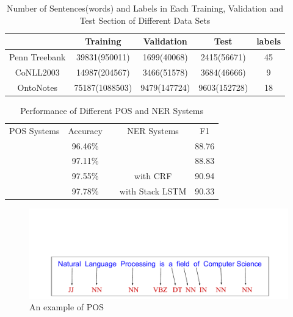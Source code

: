 \documentclass{sfuthesis}
\begin{document}

\begin{table}[]
\centering
\caption{Number of Sentences(words) and Labels in Each Training, Validation and Test Section of Different Data Sets}
\label{table:my-dataset}
\begin{tabular}{|c|c|c|c|c|} \hline
      & Training  & Validation  & Test  & labels  \\ \hline
Penn Treebank   &39831(950011) &1699(40068) &2415(56671) &45\\\hline
CoNLL2003   &14987(204567) &3466(51578) &3684(46666) &9     \\\hline
OntoNotes   &75187(1088503) &9479(147724) &9603(152728) &18     \\\hline
\end{tabular}
\end{table}


\begin{table}[]
\centering
\caption{Performance of Different POS and NER Systems}
\label{table:my-performance}
\begin{tabular}{cclcc}
POS Systems       & Accuracy &  & NER Systems           & F1
\\ \cline{1-2} \cline{4-5} 
\text{\cite{mccallum2000maximum}} & 96.46\%                      &  & \text{\cite{florian2003named}}                 & 88.76                  \\
\text{\cite{collins2002discriminative}}    & 97.11\%                      &  & \text{\cite{huang2015bidirectional}}           & 88.83                  \\
\text{\cite{huang2015bidirectional}}       & 97.55\%                      &  & \text{\cite{lample2016neural}} with CRF        & 90.94                  \\
\text{\cite{ling2015finding}}              & 97.78\%                      &  & \text{\cite{lample2016neural}} with Stack LSTM & 90.33                 
\end{tabular}
\end{table}

\begin{figure}
  \centering
  \includegraphics[scale=0.5]{posex.pdf}
 \caption{An example of POS}
  \label{fig:pos-ex}
\end{figure}
\end{document}

